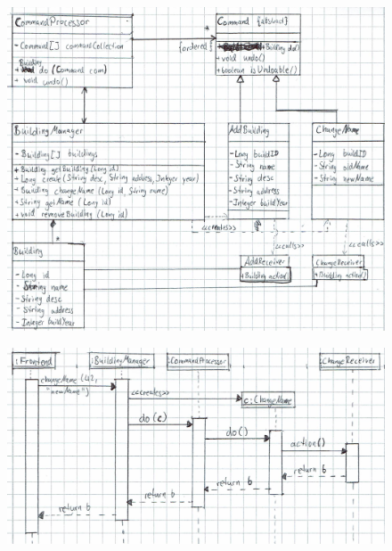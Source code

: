 \begin{figure}[h]
  \centerfloat
  \includegraphics{3_classdiag}
\end{figure}

\newpage
{}
\begin{figure}[h]
  \centerfloat
  \includegraphics{3_seqdiag}
\end{figure}